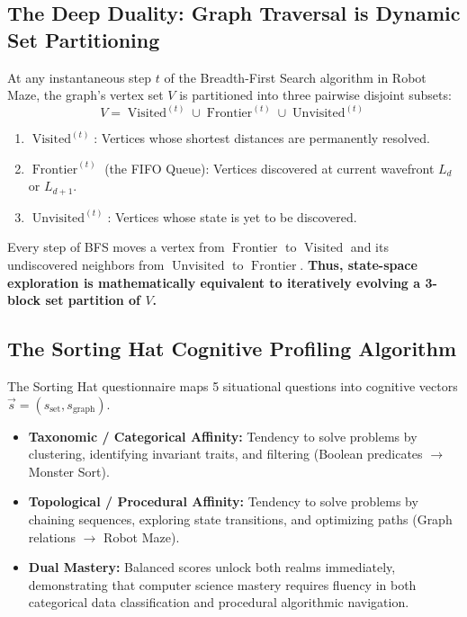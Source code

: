 \documentclass[11pt,a4paper]{article}
\theoremstyle{definition}
\begin{document}
\subsection{The Deep Duality: Graph Traversal is Dynamic Set Partitioning}
At any instantaneous step $t$ of the Breadth-First Search algorithm in Robot Maze, the graph's vertex set $V$ is partitioned into three pairwise disjoint subsets:
$$V = \operatorname{Visited}^{(t)} \cup \operatorname{Frontier}^{(t)} \cup \operatorname{Unvisited}^{(t)}$$
\begin{enumerate}
  \item $\operatorname{Visited}^{(t)}$: Vertices whose shortest distances are permanently resolved.
  \item $\operatorname{Frontier}^{(t)}$ (the FIFO Queue): Vertices discovered at current wavefront $L_d$ or $L_{d+1}$.
  \item $\operatorname{Unvisited}^{(t)}$: Vertices whose state is yet to be discovered.
\end{enumerate}
Every step of BFS moves a vertex from $\operatorname{Frontier}$ to $\operatorname{Visited}$ and its undiscovered neighbors from $\operatorname{Unvisited}$ to $\operatorname{Frontier}$.
\textbf{Thus, state-space exploration is mathematically equivalent to iteratively evolving a 3-block set partition of $V$.}

\subsection{The Sorting Hat Cognitive Profiling Algorithm}
The Sorting Hat questionnaire maps 5 situational questions into cognitive vectors $\vec{s} = (s_{\text{set}}, s_{\text{graph}})$.
\begin{itemize}
  \item \textbf{Taxonomic / Categorical Affinity:} Tendency to solve problems by clustering, identifying invariant traits, and filtering (Boolean predicates $\to$ Monster Sort).
  \item \textbf{Topological / Procedural Affinity:} Tendency to solve problems by chaining sequences, exploring state transitions, and optimizing paths (Graph relations $\to$ Robot Maze).
  \item \textbf{Dual Mastery:} Balanced scores unlock both realms immediately, demonstrating that computer science mastery requires fluency in both categorical data classification and procedural algorithmic navigation.
\end{itemize}
\end{document}
